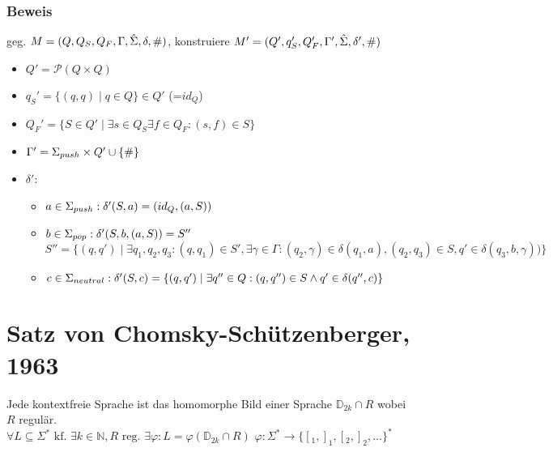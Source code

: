     \subsubsection{Beweis}
    geg. $M=(Q,Q_S,Q_F,\Gamma,\hat{\Sigma},\delta,\#)$, konstruiere $M'=(Q',q_S',Q_F',\Gamma',\hat{\Sigma},\delta',\#)$
    \begin{itemize}
        \item $Q'=\mathcal{P}(Q\times Q)$
        \item $q_S'=\{(q,q)\mid q\in Q\}\in Q'$ (=$id_Q$)
        \item $Q_F'=\{S\in Q'\mid \exists s\in Q_S\exists f\in Q_F: (s,f)\in S\}$
        \item $\Gamma'=\Sigma_{push}\times Q'\cup \{\#\}$
        \item $\delta'$:
        \begin{itemize}
            \item $a\in\Sigma_{push}: \delta'(S,a)=(id_Q,(a,S))$
            \item $b\in\Sigma_{pop} : \delta'(S,b,(a,S))=S''$\\%
            $S''=\{(q,q')\mid\exists q_1,q_2,q_3: (q,q_1)\in S', \exists\gamma\in\Gamma:(q_2,\gamma)\in\delta(q_1,a), (q_2,q_3)\in S, q'\in\delta(q_3,b,\gamma))\}$
            \item $c\in\Sigma_{neutral}: \delta'(S,c)=\{(q,q')\mid \exists q''\in Q: (q,q'')\in S\wedge q'\in \delta(q'',c)\}$
        \end{itemize}
    \end{itemize}
\section{Satz von Chomsky-Schützenberger, 1963}
    Jede kontextfreie Sprache ist das homomorphe Bild einer Sprache $\mathds{D}_{2k}\cap R$ wobei $R$ regulär.\\
    $\forall L\subseteq \Sigma^*\text{ kf. }\exists k\in\mathds{N}, R\text{ reg. }\exists\varphi:L=\varphi(\mathds{D}_{2k}\cap R)$ $\varphi:\Sigma^*\rightarrow \{[_1,]_1,[_2,]_2,\dots\}^*$
